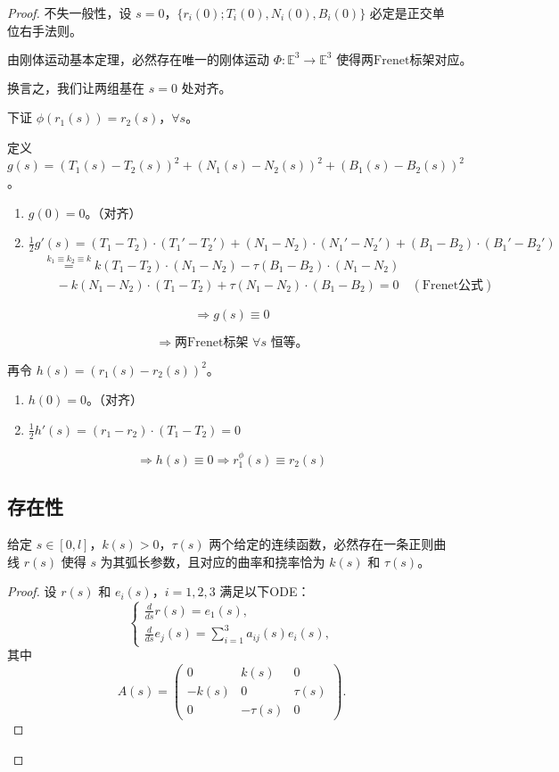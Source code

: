 \documentclass[lang=cn,10pt,thmcnt=section]{elegantbook}
\begin{document}
\begin{proof}
不失一般性，设 $s = 0$，$\{r_i(0); T_i(0), N_i(0), B_i(0)\}$ 必定是正交单位右手法则。

\[
\text{由刚体运动基本定理，必然存在唯一的刚体运动 } \Phi: \mathbb{E}^3 \to \mathbb{E}^3 \text{ 使得两Frenet标架对应。}
\]

换言之，我们让两组基在 $s = 0$ 处对齐。

下证 $\phi(r_1(s)) = r_2(s)$，$\forall s$。

定义 $g(s) = (T_1(s) - T_2(s))^2 + (N_1(s) - N_2(s))^2 + (B_1(s) - B_2(s))^2$。
\begin{enumerate}
    \item $g(0) = 0$。（对齐）
    \item $\frac{1}{2}g'(s) = (T_1 - T_2) \cdot (T_1' - T_2') + (N_1 - N_2) \cdot (N_1' - N_2') + (B_1 - B_2) \cdot (B_1' - B_2')$
    \begin{align*}
    &\stackrel{k_1 \equiv k_2 \equiv k}{=} k(T_1 - T_2) \cdot (N_1 - N_2) - \tau(B_1 - B_2) \cdot (N_1 - N_2) \\
    &\quad -k(N_1 - N_2) \cdot (T_1 - T_2) + \tau(N_1 - N_2) \cdot (B_1 - B_2) = 0 \quad (\text{Frenet公式})
    \end{align*}
\end{enumerate}

\[
\Rightarrow g(s) \equiv 0
\]

\[
\Rightarrow \text{两Frenet标架 $\forall s$ 恒等。}
\]

再令 $h(s) = (r_1(s) - r_2(s))^2$。

\begin{enumerate}
    \item $h(0) = 0$。（对齐）
    \item $\frac{1}{2}h'(s) = (r_1 - r_2) \cdot (T_1 - T_2) = 0$
\end{enumerate}

\[
\Rightarrow h(s) \equiv 0 \Rightarrow r_1^{\phi}(s) \equiv r_2(s)
\]
\subsection{存在性}
\begin{theorem}
    给定 $s \in [0, l]$，$k(s) > 0$，$\tau(s)$ 两个给定的连续函数，必然存在一条正则曲线 $r(s)$ 使得 $s$ 为其弧长参数，且对应的曲率和挠率恰为 $k(s)$ 和 $\tau(s)$。
    \end{theorem}
    
    \begin{proof}
    设 $r(s)$ 和 $e_i(s)$，$i = 1, 2, 3$ 满足以下ODE：
    \[
    \begin{cases}
    \displaystyle \frac{d}{ds} r(s) = e_1(s), \\
    \displaystyle \frac{d}{ds} e_j(s) = \sum_{i=1}^3 a_{ij}(s) e_i(s),
    \end{cases}
    \]
    其中
    \[
    A(s) = \begin{pmatrix}
    0 & k(s) & 0 \\
    -k(s) & 0 & \tau(s) \\
    0 & -\tau(s) & 0
    \end{pmatrix}.
    \]
    

\end{proof}
\end{proof}
\end{document}
